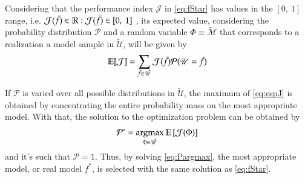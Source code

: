 Considering that the performance index $\mathcal{J}$ in \eqref{eq:fStar} has values in the $[0,\ 1]$ range, i.e. $ \mathcal{J}(\tilde{f}) \in \mathbb{R} : \mathcal{J}(\tilde{f}) \in [0,\ 1] $
, 
its expected value, considering the probability distribution  $ \mathcal{P}$ and a random variable $\Phi \equiv \tilde{\mathscr{M}}$ that corresponds to a realization a model sample in $ \tilde{\mathscr{U}}$, will be given by
\begin{equation}
  \mathbb{E}[\mathcal{J}] = \sum_{\tilde{f}\in \tilde{\mathscr{U}}} \mathcal{J}(\tilde{f})\mathcal{P}(\mathscr{U}=\tilde{f})
\label{eq:espJ}
\end{equation}

If $\mathcal{P}$ is varied over all possible distributions in $\tilde{\mathscr{U}}$, the maximum of \eqref{eq:espJ} is obtained by concentrating the entire probability mass on the most appropriate model. With that, the solution to the optimization problem can be obtained by
\begin{equation}
   \mathcal{P}^* = \operatorname*{argmax}_{\Phi\in  \tilde{\mathscr{U}}} \mathbb{E}\left[ \mathcal{J}(\Phi)  \right]   
\label{eq:Pargmax}
\end{equation}
and it's such that $\mathcal{P}=1$. Thus, by solving \eqref{eq:Pargmax}, the most appropriate model, or real model $f^*$, is selected with the same solution as \eqref{eq:fStar}.

